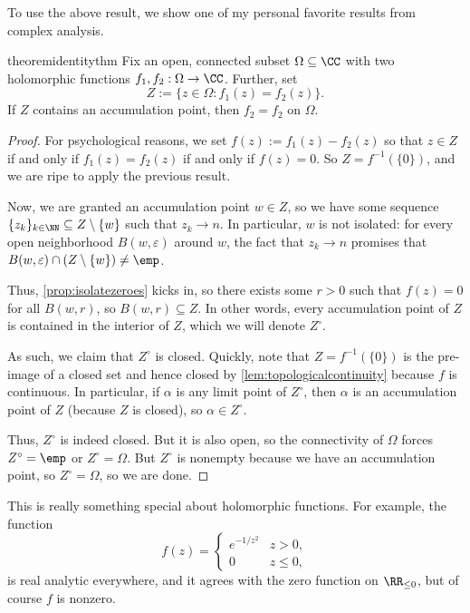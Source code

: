 To use the above result, we show one of my personal favorite results from complex analysis.
\begin{restatable}[Identity]{theorem}{identitythm} \label{thm:id}
	Fix an open, connected subset $\Omega\subseteq\CC$ with two holomorphic functions $f_1,f_2:\Omega\to\CC$. Further, set
	\[Z:=\{z\in\Omega:f_1(z)=f_2(z)\}.\]
	If $Z$ contains an accumulation point, then $f_2=f_2$ on $\Omega$.
\end{restatable}
\begin{proof}
	For psychological reasons, we set $f(z):=f_1(z)-f_2(z)$ so that $z\in Z$ if and only if $f_1(z)=f_2(z)$ if and only if $f(z)=0$. So $Z=f^{-1}(\{0\})$, and we are ripe to apply the previous result.

	Now, we are granted an accumulation point $w\in Z$, so we have some sequence $\{z_k\}_{k\in\NN}\subseteq Z\setminus\{w\}$ such that $z_k\to n$. In particular, $w$ is not isolated: for every open neighborhood $B(w,\varepsilon)$ around $w$, the fact that $z_k\to n$ promises that $B(w,\varepsilon)\cap(Z\setminus\{w\})\ne\emp$.

	Thus, \autoref{prop:isolatezeroes} kicks in, so there exists some $r>0$ such that $f(z)=0$ for all $B(w,r)$, so $B(w,r)\subseteq Z$. In other words, every accumulation point of $Z$ is contained in the interior of $Z$, which we will denote $Z^\circ$.

	As such, we claim that $Z^\circ$ is closed. Quickly, note that $Z=f^{-1}(\{0\})$ is the pre-image of a closed set and hence closed by \autoref{lem:topologicalcontinuity} because $f$ is continuous.
	In particular, if $\alpha$ is any limit point of $Z^\circ$, then $\alpha$ is an accumulation point of $Z$ (because $Z$ is closed), so $\alpha\in Z^\circ$.

	Thus, $Z^\circ$ is indeed closed. But it is also open, so the connectivity of $\Omega$ forces $Z^\circ=\emp$ or $Z^\circ=\Omega$. But $Z^\circ$ is nonempty because we have an accumulation point, so $Z^\circ=\Omega$, so we are done.
\end{proof}
\begin{remark}
	This is really something special about holomorphic functions. For example, the function
	\[f(z)=\begin{cases}
		e^{-1/z^2} & z>0, \\
		0 & z\le0,
	\end{cases}\]
	is real analytic everywhere, and it agrees with the zero function on $\RR_{\le0}$, but of course $f$ is nonzero.
\end{remark}
